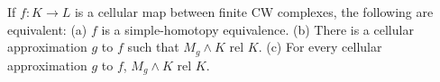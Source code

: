 If $f: K \rightarrow L$ is a cellular map between finite CW complexes, the following are equivalent:
(a) $f$ is a simple-homotopy equivalence.
(b) There is a cellular approximation $g$ to $f$ such that $M_g \wedge K$ rel $K$.
(c) For every cellular approximation $g$ to $f$, $M_g \wedge K$ rel $K$.

